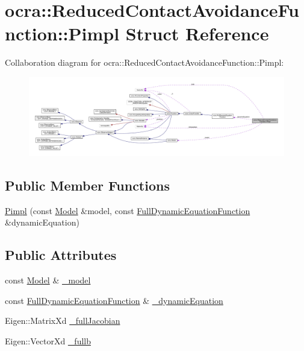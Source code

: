 \hypertarget{structReducedContactAvoidanceFunction_1_1Pimpl}{}\section{ocra\+:\+:Reduced\+Contact\+Avoidance\+Function\+:\+:Pimpl Struct Reference}
\label{structReducedContactAvoidanceFunction_1_1Pimpl}


Collaboration diagram for ocra\+:\+:Reduced\+Contact\+Avoidance\+Function\+:\+:Pimpl\+:
\nopagebreak
\begin{figure}[H]
\begin{center}
\leavevmode
\includegraphics[width=350pt]{d9/d98/structReducedContactAvoidanceFunction_1_1Pimpl__coll__graph}
\end{center}
\end{figure}
\subsection*{Public Member Functions}
\begin{DoxyCompactItemize}
\item 
\hyperlink{structReducedContactAvoidanceFunction_1_1Pimpl_ab7258766eea3fd037b4e59e381adfdd5}{Pimpl} (const \hyperlink{classocra_1_1Model}{Model} \&model, const \hyperlink{classocra_1_1FullDynamicEquationFunction}{Full\+Dynamic\+Equation\+Function} \&dynamic\+Equation)
\end{DoxyCompactItemize}
\subsection*{Public Attributes}
\begin{DoxyCompactItemize}
\item 
const \hyperlink{classocra_1_1Model}{Model} \& \hyperlink{structReducedContactAvoidanceFunction_1_1Pimpl_acd2bf5f47839d39cb37ac323e038558f}{\+\_\+model}
\item 
const \hyperlink{classocra_1_1FullDynamicEquationFunction}{Full\+Dynamic\+Equation\+Function} \& \hyperlink{structReducedContactAvoidanceFunction_1_1Pimpl_a2993139449f5c29b4a85a9e3c261834c}{\+\_\+dynamic\+Equation}
\item 
Eigen\+::\+Matrix\+Xd \hyperlink{structReducedContactAvoidanceFunction_1_1Pimpl_a6ddc277e90776add368eee6a56494f45}{\+\_\+full\+Jacobian}
\item 
Eigen\+::\+Vector\+Xd \hyperlink{structReducedContactAvoidanceFunction_1_1Pimpl_ade6d248f540e91b5b9cfe961981d03a3}{\+\_\+fullb}
\end{DoxyCompactItemize}



